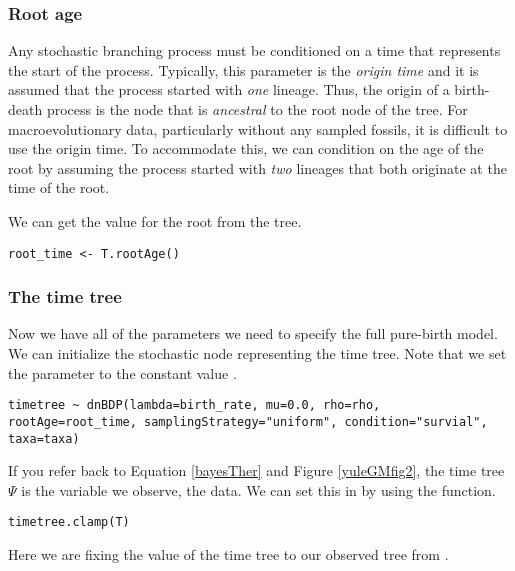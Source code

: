 \subsubsection{Root age}

Any stochastic branching process must be conditioned on a time that represents the start of the process. 
Typically, this parameter is the \textit{origin time} and it is assumed that the process started with \textit{one} lineage. 
Thus, the origin of a birth-death process is the node that is \textit{ancestral} to the root node of the tree.
For macroevolutionary data, particularly without any sampled fossils, it is difficult to use the origin time.
To accommodate this, we can condition on the age of the root by assuming the process started with \textit{two} lineages that both originate at the time of the root.

We can get the value for the root from the \citet{Springer2012} tree.

{\tt \begin{snugshade*}
\begin{lstlisting}
root_time <- T.rootAge()
\end{lstlisting}
\end{snugshade*}}

\subsubsection{The time tree}

Now we have all of the parameters we need to specify the full pure-birth model. 
We can initialize the stochastic node representing the time tree.
Note that we set the  parameter to the constant value .
{\tt \begin{snugshade*}
\begin{lstlisting}
timetree ~ dnBDP(lambda=birth_rate, mu=0.0, rho=rho, rootAge=root_time, samplingStrategy="uniform", condition="survial", taxa=taxa)
\end{lstlisting}
\end{snugshade*}}

If you refer back to Equation \ref{bayesTher} and Figure \ref{yuleGMfig2}, the time tree $\Psi$ is the variable we observe, \IE the data. 
We can set this in \Rev by using the  function.
{\tt \begin{snugshade*}
\begin{lstlisting}
timetree.clamp(T)
\end{lstlisting}
\end{snugshade*}}
Here we are fixing the value of the time tree to our observed tree from \citet{Springer2012}.

